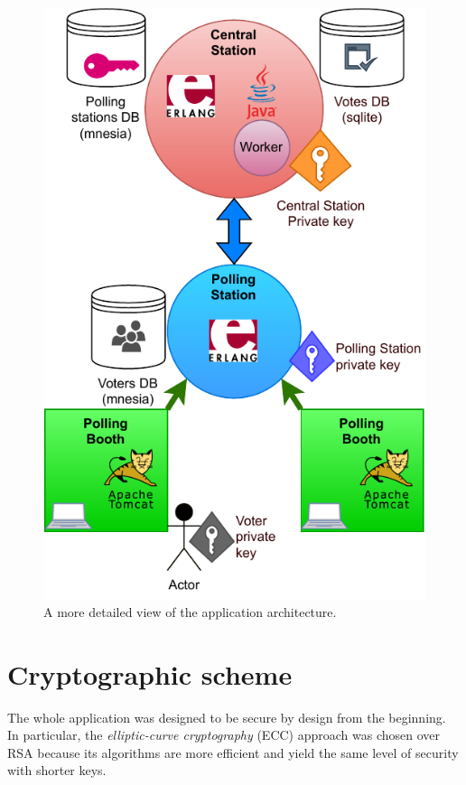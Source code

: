 \begin{figure}[H]
    \begin{center}
        \includegraphics[scale=1]{img/arch_detail.pdf}
    \end{center}
    \vspace*{-0.5cm}
    \caption{A more detailed view of the application architecture.}
    \label{fig:arch_detail}
\end{figure}

\section{Cryptographic scheme}
The whole application was designed to be secure by design from the beginning.\\
In particular, the \textit{elliptic-curve cryptography} (ECC) approach was chosen over RSA because its algorithms are more efficient and yield the same level of security with shorter keys.\\

